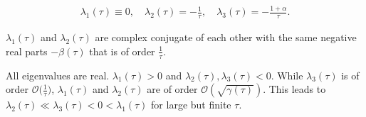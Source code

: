 \documentclass[a4paper,11pt]{article}
\theoremstyle{remark}
\begin{document}
\begin{align*}
 \lambda_1(\tau)\equiv 0, \quad \lambda_2(\tau)= -\frac{1}{\tau}, \quad \lambda_3(\tau) = -\frac{1+\alpha}{\tau}.
\end{align*}


$\lambda_1(\tau)$ and $\lambda_2(\tau)$ are complex conjugate of each other with the same negative real parts $-\beta(\tau)$ that is of order $\frac{1}{\tau}$.


All eigenvalues are real. $\lambda_1(\tau)>0$ and $\lambda_2(\tau),\lambda_3(\tau)<0$. While $\lambda_3(\tau)$ is of order $\mathcal{O}\big(\frac{1}{\tau}\big)$, $\lambda_1(\tau)$ and $\lambda_2(\tau)$ are of order $\mathcal{O}(\sqrt{\gamma(\tau)})$. This leads to $\lambda_2(\tau) \ll \lambda_3(\tau) < 0 < \lambda_1(\tau)$ for large but finite $\tau$.
\end{document}
